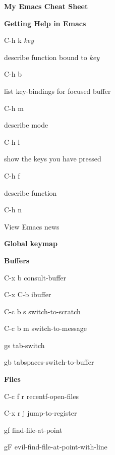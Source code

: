 \documentclass[10pt]{article}
\renewcommand\section[1]{\bigskip\par\textbf{\color{heading}\large#1}\smallskip}
\renewcommand\subsection[1]{\smallskip\par\textbf{\color{heading}#1}}
\newcommand\humanreadable[1]{{\par\color{default}\small\sffamily#1}}
\newcommand\meta[1]{\textlangle\textit{#1}\textrangle}
\begin{document}
\author{Jousimies}
\begin{multicols}{4}

  \setlength{\columnsep}{1cm}
  \begin{center}
    \LARGE\color{heading}\textbf{My Emacs Cheat Sheet}
  \end{center}

  \section{Getting Help in Emacs}
  \begin{keylist}
    \item[C-h k \meta{key}] \humanreadable{describe function bound to \meta{key}}
    \item[C-h b] \humanreadable{list key-bindings for focused buffer}
    \item[C-h m] \humanreadable{describe mode}
    \item[C-h l] \humanreadable{show the keys you have pressed}
    \item[C-h f] \humanreadable{describe function}
    \item[C-h n] \humanreadable{View Emacs news}
  \end{keylist}

  \section{Global keymap}

  \subsection{Buffers}
  \begin{keylist}
    \item[C-x b] consult-buffer
    \item[C-x C-b] ibuffer
    \item[C-c b s] switch-to-scratch
    \item[C-c b m] switch-to-message
    \item[gs] tab-switch
    \item[gb] tabspaces-switch-to-buffer
  \end{keylist}

  \subsection{Files}
  \begin{keylist}
    \item[C-c f r] recentf-open-files
    \item[C-x r j] jump-to-register
    \item[gf] find-file-at-point
    \item[gF] evil-find-file-at-point-with-line
  \end{keylist}


\end{multicols}
\end{document}
